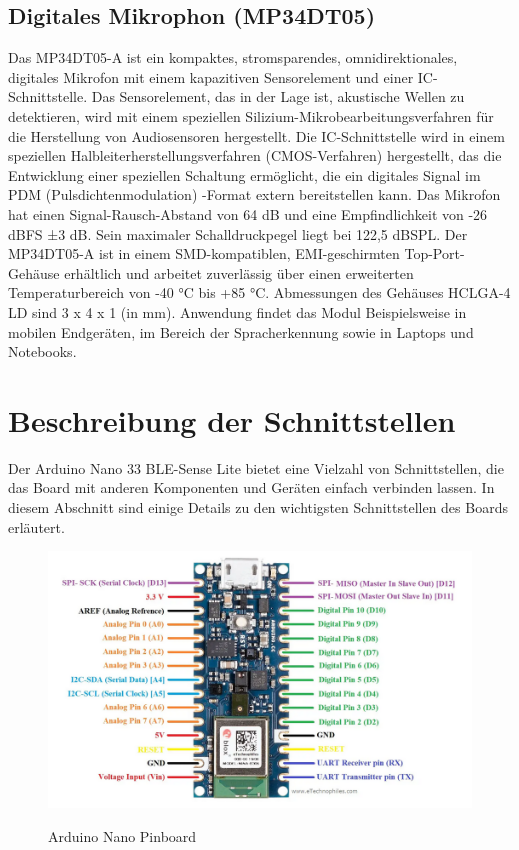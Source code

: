 \subsection{Digitales Mikrophon (MP34DT05)}
Das MP34DT05-A ist ein kompaktes, stromsparendes, omnidirektionales, digitales
Mikrofon mit einem kapazitiven Sensorelement und einer IC-Schnittstelle.
Das Sensorelement, das in der Lage ist, akustische Wellen zu detektieren, wird mit
einem speziellen Silizium-Mikrobearbeitungsverfahren für die Herstellung von
Audiosensoren hergestellt. Die IC-Schnittstelle wird in einem speziellen Halbleiterherstellungsverfahren (CMOS-Verfahren) hergestellt, das die Entwicklung einer speziellen Schaltung ermöglicht, die ein digitales Signal im PDM (Pulsdichtenmodulation) -Format extern bereitstellen kann. Das Mikrofon hat einen Signal-Rausch-Abstand von 64 dB und eine Empfindlichkeit von -26 dBFS ±3 dB. Sein maximaler Schalldruckpegel liegt bei 122,5 dBSPL. Der MP34DT05-A ist in einem SMD-kompatiblen, EMI-geschirmten Top-Port-Gehäuse erhältlich und arbeitet zuverlässig über einen erweiterten Temperaturbereich von -40 °C bis +85 °C. Abmessungen des Gehäuses HCLGA-4 LD sind 3 x 4 x 1 (in mm). Anwendung findet das Modul Beispielsweise in mobilen Endgeräten, im Bereich der Spracherkennung sowie in Laptops und Notebooks.\cite{STM3.2021}\cite{Ard.2024}

\section{Beschreibung der Schnittstellen}
Der Arduino Nano 33 BLE-Sense Lite bietet eine Vielzahl von Schnittstellen, die das Board mit anderen Komponenten und Geräten einfach verbinden lassen. In diesem Abschnitt sind einige Details zu den wichtigsten Schnittstellen des Boards erläutert.
\begin{figure}[htb]
	\includegraphics[width=14cm]{General/ArduinoPinBoard.png}
	\caption{Arduino Nano Pinboard} \label{Arduino Nano Pinbout}\begin{center}
		\cite{Arduino2023}
	\end{center}
\end{figure}

